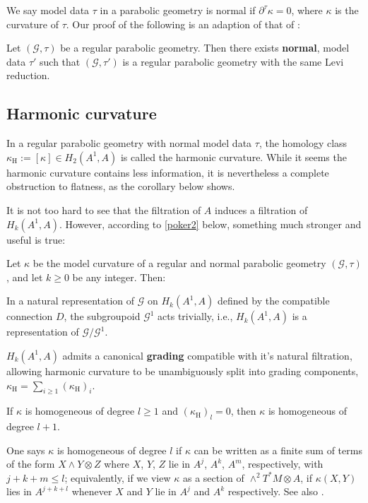 \documentclass[leqno,12pt]{amsart} %
\begin{document}
We say model data $\tau $ in a parabolic geometry is {\df normal} if
$\partial^\tau \kappa =0$, where $\kappa $ is the curvature of $\tau$.  Our proof of the
following is an adaption of that of \cite[Propositions 3.1.10, 3.1.13]{Cap_Slovak_09}:

\begin{theorem}
  Let $({\mathcal G}, \tau)$ be a regular parabolic
  geometry. Then there exists {\bfseries normal}, model data $\tau'$ such that
  $({\mathcal G} , \tau')$ is a regular parabolic geometry with the same Levi reduction.
\end{theorem}

\subsection{Harmonic curvature}\label{harmonic}
In a regular parabolic geometry with normal model data $\tau $, the homology class
$\kappa_{\mathrm H} := [\kappa] \in H_2(A^1, A)$ is called the {\df harmonic
  curvature}. While it seems the harmonic curvature contains less information, it
  is nevertheless a complete obstruction to flatness, as the corollary below shows.

It is not too hard to see that the filtration of $A$ induces a filtration of
$H_k(A^1, A)$. However, according to \eqref{poker2} below, something much stronger and
useful is true:

\begin{theorem}
  Let $\kappa $ be the model curvature of a regular and normal parabolic geometry
  $({\mathcal G} , \tau)$, and let $k \ge 0$ be any integer. Then:
  \begin{conditions}
     \item In a natural representation of ${\mathcal G} $ on $H_k(A^1, A)$ defined by the
    compatible connection $D$, the subgroupoid ${\mathcal G}^1$ acts trivially, i.e.,
    $H_k(A^1, A)$ is a representation of ${\mathcal G}/{\mathcal G}^1$.\label{poker1}
  \item $H_k(A^1, A)$ admits a canonical {\bfseries grading} compatible with it's natural filtration,
    allowing harmonic curvature to be unambiguously split into grading components,
    $\kappa_{\mathrm H} = \sum_{i\ge 1}(\kappa_{\mathrm H})_i$.\label{poker2}
  \item If $\kappa $ is homogeneous of degree $l \ge 1$ and $(\kappa_{\mathrm H})_l = 0$,
    then $\kappa $ is homogeneous of degree $l + 1$.\label{poker3}
  \end{conditions}
\end{theorem}
\noindent%
One says {\df $\kappa$ is homogeneous of degree $l$} if $\kappa$ can be written as a
finite sum of terms of the form $X\wedge Y \otimes Z$ where $X$, $Y$, $Z$ lie in $A^j$,
$A^k$, $A^m$, respectively, with $j+k+m \le l$; equivalently, if we view $\kappa $ as a
section of $\wedge^2 T^*\!M \otimes A$, if $\kappa(X, Y)$ lies in $A^{j+k+l}$ whenever $X$
and $Y$ lie in $A^j$ and $A^k$ respectively. See also \cite[\S3.1.1,
p.~235]{Cap_Slovak_09}.
\end{document}
